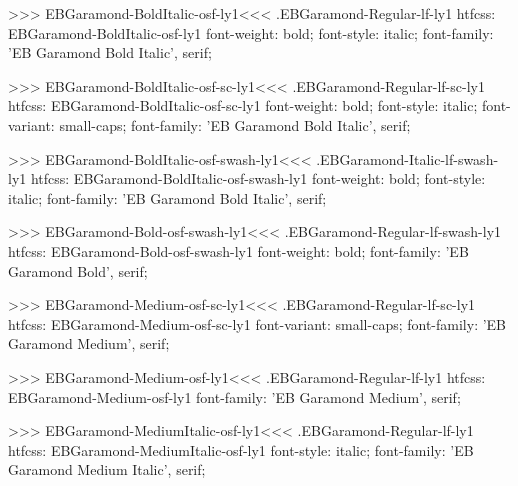 {{>>>
\<EBGaramond-BoldItalic-osf-ly1\><<<
.EBGaramond-Regular-lf-ly1
htfcss:  EBGaramond-BoldItalic-osf-ly1  font-weight: bold; font-style: italic; font-family: 'EB Garamond Bold Italic', serif;

>>>
\<EBGaramond-BoldItalic-osf-sc-ly1\><<<
.EBGaramond-Regular-lf-sc-ly1
htfcss:  EBGaramond-BoldItalic-osf-sc-ly1  font-weight: bold; font-style: italic; font-variant: small-caps; font-family: 'EB Garamond Bold Italic', serif;

>>>
\<EBGaramond-BoldItalic-osf-swash-ly1\><<<
.EBGaramond-Italic-lf-swash-ly1
htfcss:  EBGaramond-BoldItalic-osf-swash-ly1  font-weight: bold; font-style: italic; font-family: 'EB Garamond Bold Italic', serif;

>>>
\<EBGaramond-Bold-osf-swash-ly1\><<<
.EBGaramond-Regular-lf-swash-ly1
htfcss:  EBGaramond-Bold-osf-swash-ly1  font-weight: bold; font-family: 'EB Garamond Bold', serif;

>>>
\<EBGaramond-Medium-osf-sc-ly1\><<<
.EBGaramond-Regular-lf-sc-ly1
htfcss:  EBGaramond-Medium-osf-sc-ly1  font-variant: small-caps; font-family: 'EB Garamond Medium', serif;

>>>
\<EBGaramond-Medium-osf-ly1\><<<
.EBGaramond-Regular-lf-ly1
htfcss:  EBGaramond-Medium-osf-ly1  font-family: 'EB Garamond Medium', serif;

>>>
\<EBGaramond-MediumItalic-osf-ly1\><<<
.EBGaramond-Regular-lf-ly1
htfcss:  EBGaramond-MediumItalic-osf-ly1  font-style: italic; font-family: 'EB Garamond Medium Italic', serif;

}}
